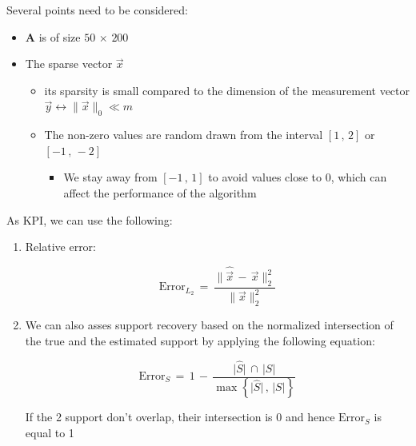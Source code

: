\documentclass[12pt,a4paper]{book}
\begin{document}
Several points need to be considered:

\begin{itemize}
    
    \item $\boldsymbol A$ is of size $50 \, \times \, 200$
    
    \item The sparse vector $\vec{x}$ 
    
        \begin{itemize}
            \item its sparsity is small compared to the dimension of the measurement vector $\vec{y} \leftrightarrow \lVert \vec{x} \rVert_0 \ll m$
            
            \item The non-zero values are random drawn from the interval $[1\, , \, 2]$ or $[-1\, , \, -2]$
            
                \begin{itemize}
                    \item We stay away from $[-1\, , \, 1]$ to avoid values close to 0, which can affect the performance of the algorithm
                \end{itemize}
            
            
        \end{itemize}
    

\end{itemize}

As KPI, we can use the following:

\begin{enumerate}
    \item Relative error:
    
    \begin{equation}
        \text{Error}_{L_2} \, = \, \displaystyle\frac{\lVert  \hat{\vec{x}} \, - \, \vec{x} \rVert_2^2 }{\lVert \vec{x} \rVert_2^2}
    \end{equation}
    
    
\item We can also asses support recovery based on the normalized intersection of the true and the estimated support by applying the following equation:

\begin{equation}
 \text{Error}_{S} \, = \, 1 \, - \, \displaystyle\frac{\lvert \hat{S} \rvert \, \cap \, \lvert S \rvert}{\max \left\{ \lvert \hat{S} \rvert \, , \,  \lvert S \rvert  \right\} }  
\end{equation}
 
If the 2 support don't overlap, their intersection is 0 and hence $\text{Error}_{S}$ is equal to 1
\end{enumerate}
\end{document}
